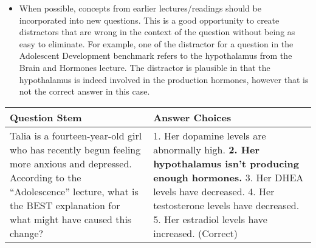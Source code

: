 \documentclass[
]{article}
\providecommand{\tightlist}{%
  \setlength{\itemsep}{0pt}\setlength{\parskip}{0pt}}
\begin{document}
\begin{enumerate}
  \begin{itemize}
  \tightlist
  \item
    When possible, concepts from earlier lectures/readings should be incorporated into new questions. This is a good opportunity to create distractors that are wrong in the context of the question without being as easy to eliminate. For example, one of the distractor for a question in the Adolescent Development benchmark refers to the hypothalamus from the Brain and Hormones lecture. The distractor is plausible in that the hypothalamus is indeed involved in the production hormones, however that is not the correct answer in this case.
  \end{itemize}
\end{enumerate}

\begin{longtable}[]{@{}ll@{}}
\toprule
\begin{minipage}[b]{0.30\columnwidth}\raggedright
\textbf{Question Stem}\strut
\end{minipage} & \begin{minipage}[b]{0.64\columnwidth}\raggedright
\textbf{Answer Choices}\strut
\end{minipage}\tabularnewline
\midrule
\endhead
\begin{minipage}[t]{0.30\columnwidth}\raggedright
Talia is a fourteen-year-old girl who has recently begun feeling more anxious and depressed. According to the ``Adolescence'' lecture, what is the BEST explanation for what might have caused this change?\strut
\end{minipage} & \begin{minipage}[t]{0.64\columnwidth}\raggedright
1. Her dopamine levels are abnormally high. \textbf{2. Her hypothalamus isn't producing enough hormones.} 3. Her DHEA levels have decreased. 4. Her testosterone levels have decreased. 5. Her estradiol levels have increased. (Correct)\strut
\end{minipage}\tabularnewline
\bottomrule
\end{longtable}
\end{document}
